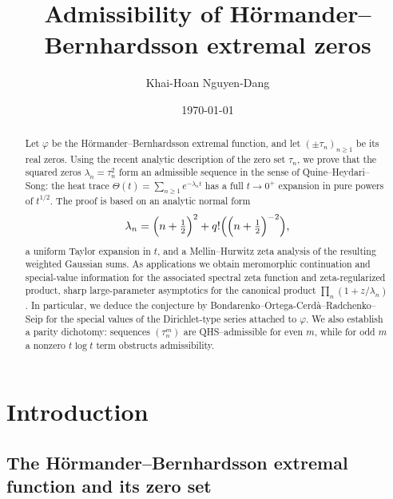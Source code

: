 \documentclass[11pt,letterpaper]{amsart}
\title{Admissibility of H\"ormander--Bernhardsson extremal zeros}
\author{Khai-Hoan Nguyen-Dang}
\date{\today}
\numberwithin{equation}{section}
\theoremstyle{definition}
\begin{document}
\maketitle


\begin{abstract}
Let $\varphi$ be the H\"ormander--Bernhardsson extremal function, and let $(\pm\tau_n)_{n\ge1}$ be its real zeros. Using the recent analytic description of the zero set ${\tau_n}$, we prove that the squared zeros $\lambda_n=\tau_n^{2}$ form an admissible sequence in the sense of Quine--Heydari--Song: the heat trace $\Theta(t)=\sum_{n\ge1}e^{-\lambda_n t}$ has a full $t\to0^{+}$ expansion in pure powers of $t^{1/2}$. The proof is based on an analytic normal form
\[
\lambda_n=\Bigl(n+\tfrac12\Bigr)^2+q!\Bigl(\Bigl(n+\tfrac12\Bigr)^{-2}\Bigr),
\]
a uniform Taylor expansion in $t$, and a Mellin--Hurwitz zeta analysis of the resulting weighted Gaussian sums. As applications we obtain meromorphic continuation and special-value information for the associated spectral zeta function and zeta-regularized product, sharp large-parameter asymptotics for the canonical product $\prod_{n}(1+z/\lambda_n)$. In particular, we deduce the conjecture by
Bondarenko--Ortega-Cerd\`a--Radchenko--Seip for the special values of the Dirichlet-type series attached to $\varphi$. We also establish a parity dichotomy: sequences $(\tau_n^m)$ are QHS--admissible
for even $m$, while for odd $m$ a nonzero $t\log t$ term obstructs admissibility.
\end{abstract}



\tableofcontents

\section{Introduction}

\subsection{The H\"ormander--Bernhardsson extremal function and its zero set}
\end{document}
